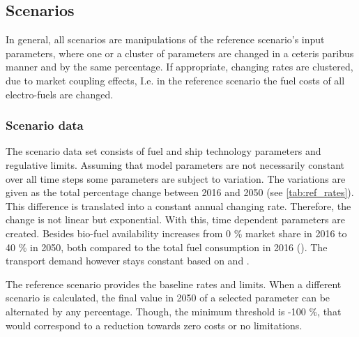 \documentclass[article]{elsarticle}
\begin{document}
\subsection{Scenarios}
\label{subsec:Sce}
In general, all scenarios are manipulations of the reference scenario's input parameters, where one or a cluster of parameters are changed in a ceteris paribus manner and by the same percentage. If appropriate, changing rates are clustered, due to market coupling effects, I.e. in the reference scenario the fuel costs of all electro-fuels are changed.

\subsubsection{Scenario data}
The scenario data set consists of fuel and ship technology parameters and regulative limits. Assuming that model parameters are not necessarily constant over all time steps some parameters are subject to variation. The variations are given as the total percentage change between 2016 and 2050 (see \cref{tab:ref_rates}). This difference is translated into a constant annual changing rate. Therefore, the change is not linear but exponential. With this, time dependent parameters are created. Besides bio-fuel availability increases from 0 \% market share in 2016 to 40 \% in 2050, both compared to the total fuel consumption in 2016 (\cite{DEA2016}). The transport demand however stays constant based on \cite[p.~18]{ITF2018} and \cite[p.~19]{Rex2017}.
\par
The reference scenario provides the baseline rates and limits. When a different scenario is calculated, the final value in 2050 of a selected parameter can be alternated by any percentage. Though, the minimum threshold is -100 \%, that would correspond to a reduction towards zero costs or no limitations.
\end{document}
